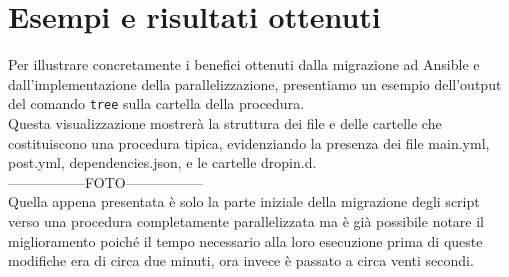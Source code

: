 \section{Esempi e risultati ottenuti}
\label{sec:esempi_risultati}

Per illustrare concretamente i benefici ottenuti dalla migrazione ad Ansible e dall'implementazione
della parallelizzazione, presentiamo un esempio dell'output del comando \texttt{tree}
sulla cartella della procedura.\\ Questa visualizzazione mostrerà la struttura dei
file e delle cartelle che costituiscono una procedura tipica, evidenziando la
presenza dei file main.yml, post.yml, dependencies.json, e le cartelle dropin.d.\\
-----------------FOTO-----------------\\ Quella appena presentata è solo la
parte iniziale della migrazione degli script verso una procedura completamente
parallelizzata ma è già possibile notare il miglioramento poiché il tempo
necessario alla loro esecuzione prima di queste modifiche era di circa due
minuti, ora invece è passato a circa venti secondi.